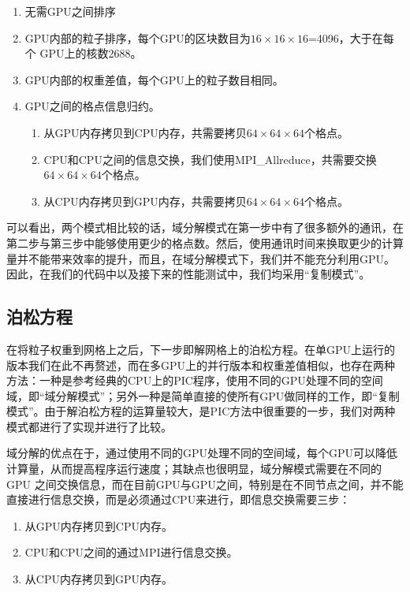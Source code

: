 \begin{enumerate}
  \item 无需GPU之间排序
  \item GPU内部的粒子排序，每个GPU的区块数目为$16 \times 16 \times 16$=4096，大于在每个 GPU上的核数2688。
  \item GPU内部的权重差值，每个GPU上的粒子数目相同。
  \item GPU之间的格点信息归约。
  \begin{enumerate}
    \item 从GPU内存拷贝到CPU内存，共需要拷贝$64 \times 64 \times 64$个格点。
    \item CPU和CPU之间的信息交换，我们使用MPI\_Allreduce，共需要交换 $64 \times 64 \times 64$个格点。
    \item 从CPU内存拷贝到GPU内存，共需要拷贝$64 \times 64 \times 64$个格点。
  \end{enumerate}
\end{enumerate}

可以看出，两个模式相比较的话，域分解模式在第一步中有了很多额外的通讯，在第二步与第三步中能够使用更少的格点数。然后，使用通讯时间来换取更少的计算量并不能带来效率的提升，而且，在域分解模式下，我们并不能充分利用GPU。因此，在我们的代码中以及接下来的性能测试中，我们均采用“复制模式”。

\subsection{泊松方程}
\label{section:PIC_GPU_Poisson}
在将粒子权重到网格上之后，下一步即解网格上的泊松方程。在单GPU上运行的版本我们在此不再赘述，而在多GPU上的并行版本和权重差值相似，也存在两种方法：一种是参考经典的CPU上的PIC程序，使用不同的GPU处理不同的空间域，即“域分解模式”；另外一种是简单直接的使所有GPU做同样的工作，即“复制模式”。由于解泊松方程的运算量较大，是PIC方法中很重要的一步，我们对两种模式都进行了实现并进行了比较。

域分解的优点在于，通过使用不同的GPU处理不同的空间域，每个GPU可以降低计算量，从而提高程序运行速度；其缺点也很明显，域分解模式需要在不同的GPU 之间交换信息，而在目前GPU与GPU之间，特别是在不同节点之间，并不能直接进行信息交换，而是必须通过CPU来进行，即信息交换需要三步：
\begin{enumerate}
  \item 从GPU内存拷贝到CPU内存。
  \item CPU和CPU之间的通过MPI进行信息交换。
  \item 从CPU内存拷贝到GPU内存。
\end{enumerate}

